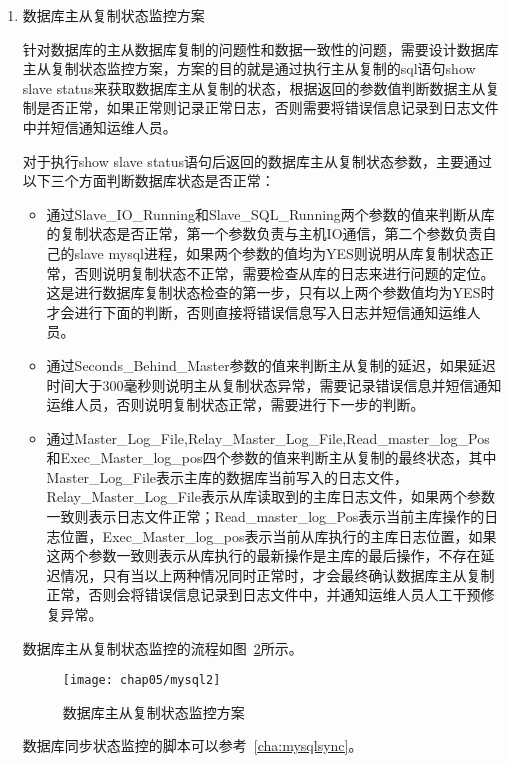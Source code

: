 \begin{enumerate}
综上所述，数据健康监控脚本的执行流程和顺序如图~\ref{fig:mysql-healty-monitor}所示。
\begin{figure}[H] %
  \centering
  \texttt{[image: chap05/mysql1]}
  \caption{数据库健康状态监控方案}
  \label{fig:mysql-healty-monitor}
\end{figure}
完整的数据库健康监控脚本可以参考附录~\ref{cha:mysqlhealth}。

\item 数据库主从复制状态监控方案

针对数据库的主从数据库复制的问题性和数据一致性的问题，需要设计数据库主从复制状态监控方案，方案的目的就是通过执行主从复制的sql语句show slave status来获取数据库主从复制的状态，根据返回的参数值判断数据主从复制是否正常，如果正常则记录正常日志，否则需要将错误信息记录到日志文件中并短信通知运维人员。

对于执行show slave status语句后返回的数据库主从复制状态参数，主要通过以下三个方面判断数据库状态是否正常：
\begin{itemize}
  \item 通过Slave\_IO\_Running和Slave\_SQL\_Running两个参数的值来判断从库的复制状态是否正常，第一个参数负责与主机IO通信，第二个参数负责自己的slave mysql进程，如果两个参数的值均为YES则说明从库复制状态正常，否则说明复制状态不正常，需要检查从库的日志来进行问题的定位。这是进行数据库复制状态检查的第一步，只有以上两个参数值均为YES时才会进行下面的判断，否则直接将错误信息写入日志并短信通知运维人员。
  \item 通过Seconds\_Behind\_Master参数的值来判断主从复制的延迟，如果延迟时间大于300毫秒则说明主从复制状态异常，需要记录错误信息并短信通知运维人员，否则说明复制状态正常，需要进行下一步的判断。
  \item 通过Master\_Log\_File,Relay\_Master\_Log\_File,Read\_master\_log\_Pos和Exec\_Master\_log\_pos四个参数的值来判断主从复制的最终状态，其中Master\_Log\_File表示主库的数据库当前写入的日志文件，Relay\_Master\_Log\_File表示从库读取到的主库日志文件，如果两个参数一致则表示日志文件正常；Read\_master\_log\_Pos表示当前主库操作的日志位置，Exec\_Master\_log\_pos表示当前从库执行的主库日志位置，如果这两个参数一致则表示从库执行的最新操作是主库的最后操作，不存在延迟情况，只有当以上两种情况同时正常时，才会最终确认数据库主从复制正常，否则会将错误信息记录到日志文件中，并通知运维人员人工干预修复异常。
\end{itemize}

数据库主从复制状态监控的流程如图~\ref{fig:mysql-sync-monitor}所示。
\begin{figure}[H] %
  \centering
  \texttt{[image: chap05/mysql2]}
  \caption{数据库主从复制状态监控方案}
  \label{fig:mysql-sync-monitor}
\end{figure}
数据库同步状态监控的脚本可以参考~\ref{cha:mysqlsync}。
\end{enumerate}

